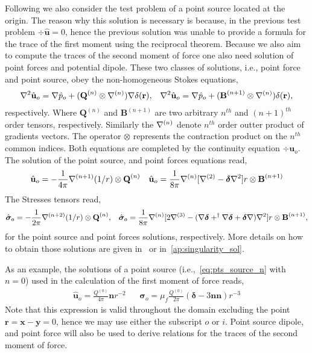 Following \citet{stone2001inertial} we also consider the test problem of a point source located at the origin.
The reason why this solution is necessary is because, in the previous test problem $\div \hat{\textbf{u}}= 0$, hence the previous solution was unable to provide a formula for the trace of the first moment using the reciprocal theorem.
Because we also aim to compute the traces of the second moment of force one also need solution of point forces and potential dipole.  
These two classes of solutions, i.e., point force and point source, obey   the non-homogeneous Stokes equations, 
\begin{align}
    \mathbf{\nabla}^2 \hat{\textbf{u}}_o = \mathbf{\nabla} \hat{p}_o + (\textbf{Q}^{(n)}\otimes \mathbf{\nabla}^{(n)})\mathbf{\nabla} \delta(\textbf{r}),
    &&
    \mathbf{\nabla}^2 \hat{\textbf{u}}_o = \mathbf{\nabla} \hat{p}_o + (\textbf{B}^{(n+1)}\otimes \mathbf{\nabla}^{(n)}) \delta(\textbf{r}),
\end{align}
respectively. 
Where $\textbf{Q}^{(n)}$ and $\textbf{B}^{(n+1)}$ are two arbitrary $n^{th}$ and $(n+1)^{th}$ order tensors, respectively. 
Similarly the $\mathbf{\nabla}^{(n)}$ denote $n^{th}$ order outter product of gradients vectors.
The operator $\otimes$ represents the contraction product on the $n^{th}$ common indices. 
Both equations are completed by the continuity equation $\div \textbf{u}_{o}$. 
The solution of the point source, and point forces equations read, 
\begin{align}
    \hat{\textbf{u}}_o = -\frac{1}{4\pi}\grad^{(n+1)}(1/r)\otimes \textbf{Q}^{(n)}
    \label{eq:pts_source_n}
    &&
    \hat{\textbf{u}}_o = \frac{1}{8\pi}\grad^{(n)}[\grad^{(2)} - \bm\delta \grad^2]r
    \otimes \textbf{B}^{(n+1)}
\end{align}
The Stresses tensors read, 
\begin{align}
    \hat{\bm\sigma}_o = -\frac{1}{2\pi}\mathbf{\nabla}^{(n+2)}(1/r)\otimes \textbf{Q}^{(n)}, 
    &&
    \hat{\bm\sigma}_o = \frac{1}{8\pi}\mathbf{\nabla}^{(n)}[
        2\mathbf{\nabla}^{(3)}
        -(\mathbf{\nabla} \bm\delta + ^\dagger\mathbf{\nabla}\bm\delta+\bm\delta \mathbf{\nabla})\mathbf{\nabla}^2
    ]r\otimes \textbf{B}^{(n+1)},
\end{align}
for the point source and point forces solutions, respectively. 
More details on how to obtain those solutions are given in~\citet[Chapter 6]{pozrikidis2011introduction} or in~\ref{ap:singularity_sol}. 

As an example, the solutions of a point source (i.e.,~\ref{eq:pts_source_n} with $n=0$) used in the calculation of the first moment of force reads, 
\begin{align}
    \hat{\textbf{u}}_{o} = \frac{Q^{(0)}}{4\pi} \textbf{n}r^{-2}
    && \hat{\bm\sigma}_{o} = \mu_f \frac{Q^{(0)}}{2\pi}\left(
        \bm\delta
        - 3 \textbf{nn}
    \right)r^{-3}
    \label{eq:point_source}
\end{align}
Note that this expression is valid throughout the domain excluding the point $\textbf{r} =  \textbf{x} -  \textbf{y} = 0$, hence we may use either the subscript $o$ or $i$. 
Point source dipole, and point force will also be used to derive relations for the traces of the second moment of force. 


